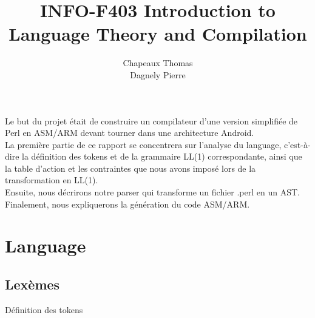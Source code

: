 \documentclass[a4paper,10pt]{article}
\title{INFO-F403 Introduction to Language Theory and Compilation}
\author{Chapeaux Thomas\\Dagnely Pierre}
\begin{document}
\maketitle

Le but du projet était de construire un compilateur d'une version simplifiée de Perl en ASM/ARM devant tourner dans une architecture Android.\\

La première partie de ce rapport se concentrera sur l'analyse du language, c'est-à-dire la définition des tokens et de la grammaire LL(1) correspondante, ainsi que la table d'action et les contraintes que nous avons imposé lors de la transformation en LL(1).\\

Ensuite, nous décrirons notre parser qui transforme un fichier .perl en un AST.\\

Finalement, nous expliquerons la génération du code ASM/ARM.

\pagebreak

\section{Language}
\subsection{Lexèmes}

Définition des tokens~\\
\end{document}
